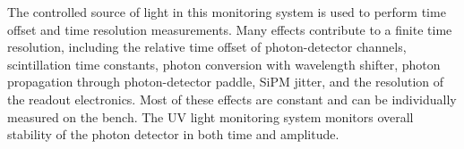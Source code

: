 The controlled source of light  
in this monitoring system is used to perform time offset and time resolution measurements.  
Many effects contribute to a finite time resolution, including the relative time offset of photon-detector channels, scintillation time constants, 
photon conversion with wavelength shifter, photon propagation through photon-detector paddle, SiPM jitter, and the resolution of the readout electronics.  
Most of these effects are constant and can be individually 
measured on the bench.  The UV light monitoring system monitors overall stability of the photon detector in both time
and amplitude.
